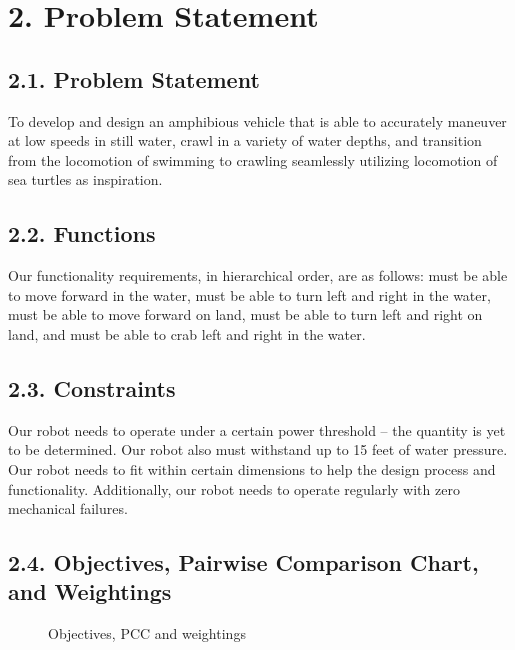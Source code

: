 \documentclass[10pt]{article}
\begin{document}
\section{2. Problem Statement}
\subsection{2.1. Problem Statement}
To develop and design an amphibious vehicle that is able to accurately maneuver at low speeds in still water, crawl in a variety of water depths, and transition  from the locomotion of swimming to crawling seamlessly utilizing locomotion of sea turtles as inspiration.
\subsection{2.2. Functions}
Our functionality requirements, in hierarchical order, are as follows: must be able to move forward in the water, must be able to turn left and right in the water, must be able to move forward on land, must be able to turn left and right on land, and must be able to crab left and right in the water.
\subsection{2.3. Constraints}
Our robot needs to operate under a certain power threshold – the quantity is yet to be determined. Our robot also must withstand up to 15 feet of water pressure. Our robot needs to fit within certain dimensions to help the design process and functionality. Additionally, our robot needs to operate regularly with zero mechanical failures. 
\subsection{2.4. Objectives, Pairwise Comparison Chart, and Weightings}

\begin{figure}
\caption{Objectives, PCC and weightings}
\label{fig:obj}
\end{figure}
%
%
%
%
%
%
%
%
\end{document}
